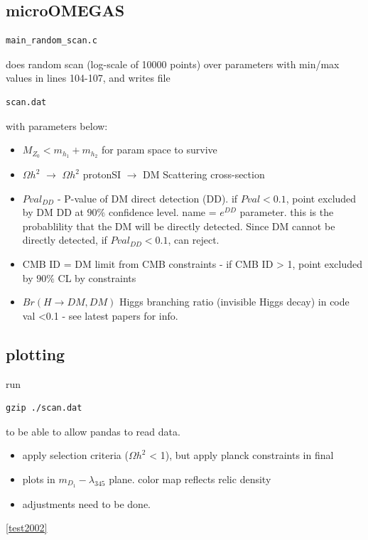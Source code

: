 \documentclass[11pt,a4paper]{article}
\begin{document}
\subsection{microOMEGAS}
\begin{verbatim}main_random_scan.c\end{verbatim} does random scan (log-scale of 10000 points) over parameters with min/max values in lines 104-107, and writes file \begin{verbatim}scan.dat\end{verbatim} with parameters below:
\begin{itemize}
    \item $M_{Z_0}<m_{h_1} + m_{h_2}$ for param space to survive
    \item $\Omega h^2$ $\rightarrow$ $\Omega h^2$ protonSI $\rightarrow$ DM Scattering cross-section
    \item $Pval_{DD}$ - P-value of DM direct detection (DD). if $Pval < 0.1$, point excluded by DM DD at $90\%$ confidence level. name = $e^{DD}$ parameter. this is the probablility that the DM will be directly detected. Since DM cannot be directly detected, if $Pval_{DD} < 0.1$, can reject.
    \item CMB ID = DM limit from CMB constraints - if CMB ID > 1, point excluded by $90\%$ CL by constraints
    \item $Br(H\rightarrow DM, DM)$ Higgs branching ratio (invisible Higgs decay) in code val <0.1 - see latest papers for info.
\end{itemize}
\subsection{plotting}
run \begin{verbatim}gzip ./scan.dat\end{verbatim} to be able to allow pandas to read data.
\begin{itemize}
    \item apply selection criteria ($\Omega h^2$ < 1), but apply planck constraints in final
    \item plots in $m_{D_1}-\lambda_{345}$ plane. color map reflects relic density
    \item adjustments need to be done.
\end{itemize}
\ref{test2002}

\end{document}
